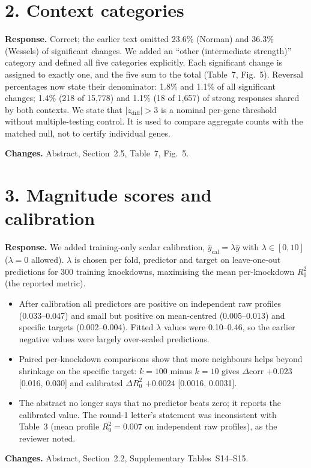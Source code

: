 \documentclass[10pt]{article}
\newcommand{\resp}{\par\smallskip\noindent\textbf{Response.} }
\newcommand{\chg}{\par\smallskip\noindent\textbf{Changes.} }
\begin{document}
\section*{2. Context categories}
\resp Correct; the earlier text omitted 23.6\% (Norman) and 36.3\% (Wessels) of significant changes. We added an ``other (intermediate strength)'' category and defined all five categories explicitly. Each significant change is assigned to exactly one, and the five sum to the total (Table~7, Fig.~5).
Reversal percentages now state their denominator: 1.8\% and 1.1\% of all significant changes; 1.4\% (218 of 15{,}778) and 1.1\% (18 of 1{,}657) of strong responses shared by both contexts.
We state that $|z_\text{diff}|>3$ is a nominal per-gene threshold without multiple-testing control. It is used to compare aggregate counts with the matched null, not to certify individual genes.
\chg Abstract, Section~2.5, Table~7, Fig.~5.

\section*{3. Magnitude scores and calibration}
\resp We added training-only scalar calibration, $\hat y_\text{cal}=\lambda\hat y$ with $\lambda\in[0,10]$ ($\lambda=0$ allowed). $\lambda$ is chosen per fold, predictor and target on leave-one-out predictions for 300 training knockdowns, maximising the mean per-knockdown $R^2_0$ (the reported metric).
\begin{itemize}
\item After calibration all predictors are positive on independent raw profiles (0.033--0.047) and small but positive on mean-centred (0.005--0.013) and specific targets (0.002--0.004). Fitted $\lambda$ values were 0.10--0.46, so the earlier negative values were largely over-scaled predictions.
\item Paired per-knockdown comparisons show that more neighbours helps beyond shrinkage on the specific target: $k=100$ minus $k=10$ gives $\Delta$corr $+0.023$ [0.016, 0.030] and calibrated $\Delta R^2_0$ $+0.0024$ [0.0016, 0.0031].
\item The abstract no longer says that no predictor beats zero; it reports the calibrated value. The round-1 letter's statement was inconsistent with Table~3 (mean profile $R^2_0=0.007$ on independent raw profiles), as the reviewer noted.
\end{itemize}
\chg Abstract, Section~2.2, Supplementary Tables~S14--S15.
\end{document}
